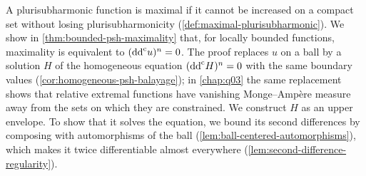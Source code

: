 A plurisubharmonic function is maximal if it cannot be increased on a compact set without losing plurisubharmonicity (\cref{def:maximal-plurisubharmonic}). We show in \cref{thm:bounded-psh-maximality} that, for locally bounded functions, maximality is equivalent to $(\mathrm{dd}^{\mathrm{c}} u)^n=0$. The proof replaces $u$ on a ball by a solution $H$ of the homogeneous equation $(\mathrm{dd}^{\mathrm{c}} H)^n=0$ with the same boundary values (\cref{cor:homogeneous-psh-balayage}); in \cref{chap:q03} the same replacement shows that relative extremal functions have vanishing Monge--Amp\`ere measure away from the sets on which they are constrained. We construct $H$ as an upper envelope. To show that it solves the equation, we bound its second differences by composing with automorphisms of the ball (\cref{lem:ball-centered-automorphisms}), which makes it twice differentiable almost everywhere (\cref{lem:second-difference-regularity}).

